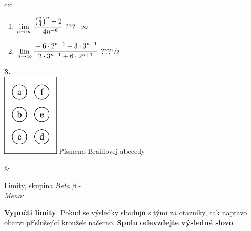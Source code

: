 \documentclass[10pt]{report}
\begin{document}
\begin{tabular}{c:c}
\begin{minipage}[c][104.5mm][t]{0.5\linewidth}
\begin{center}
\begin{minipage}{0.79\linewidth}
\begin{center}
\begin{varwidth}{\linewidth}
\begin{enumerate}
\item $\lim\limits_{n\to\infty}\cfrac{\left(\frac{2}{4}\right)^n -2}{-4n^{-6}}$\quad \dotfill\; ???\;\dotfill \quad $-\infty$
\item $\lim\limits_{n\to\infty}\cfrac{-6\cdot 2^{n+1}+3\cdot 3^{n+1}}{2\cdot 3^{n-1}+6\cdot 2^{n+1}}$\quad \dotfill\; ???\;\dotfill \quad $\nicefrac{1}{2}$
\end{enumerate}
\end{varwidth}
\end{center}
\end{minipage}
\begin{minipage}{0.20\linewidth}
\begin{center}
{\Huge\bfseries 3.} \\[2mm]
\includegraphics[height=40mm]{../images/braille.png}
{\small Písmeno Braillovej abecedy}
\end{center}
\end{minipage}
\end{center}
\end{minipage}
&
\begin{minipage}[c][104.5mm][t]{0.5\linewidth}
\begin{center}
\vspace{7mm}
{\huge Limity, skupina \textit{Beta $\beta$} -}\\[5mm]
\textit{Meno:}\phantom{xxxxxxxxxxxxxxxxxxxxxxxxxxxxxxxxxxxxxxxxxxxxxxxxxxxxxxxxxxxxxxxxx}\\[5mm]
\begin{minipage}{0.95\linewidth}
\begin{center}
\textbf{Vypočti limity}. Pokud se výsledky shodujú s tými za otazníky, tak napravo\\obarvi příslušející kroužek načerno. \textbf{Spolu odevzdejte výsledné slovo}.
\end{center}
\end{minipage}
\\[1mm]
\begin{minipage}{0.79\linewidth}
\begin{center}
\begin{varwidth}{\linewidth}

\end{varwidth}
\end{center}
\end{minipage}
\end{center}
\end{minipage}
\end{tabular}
\end{document}
